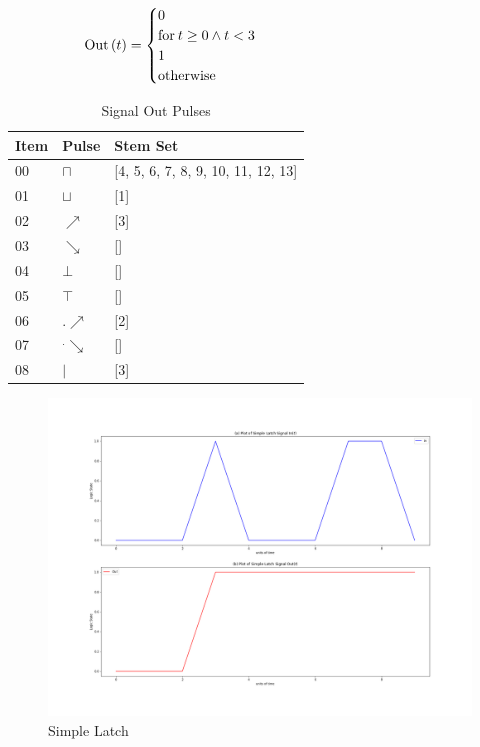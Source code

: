 \documentclass[10pt,journal]{IEEEtran}
\begin{document}
\begin{equation}
 \begin{minipage}{250pt}
\begin{flushleft} $\displaystyle \operatorname{Out}{\left(t \right)} = \begin{cases} 0 & \\  \text{for}\: t \geq 0 \wedge t < 3 \\1 & \\  \text{otherwise} \end{cases}$  \end{flushleft}
 \end{minipage}
 \end{equation}
\begin{table}[H] \caption{Signal Out Pulses}\centering\begin{tabular}{|p{.4cm}|p{.5cm}|p{6.5cm}|}\hline Item&Pulse &Stem Set\\ \hline 00& \footnotesize$\sqcap$ & \footnotesize[4, 5, 6, 7, 8, 9, 10, 11, 12, 13]\\ \hline 01& \footnotesize$\sqcup$ & \footnotesize[1]\\ \hline 02& \footnotesize$\nearrow$ & \footnotesize[3]\\ \hline 03& \footnotesize$\searrow$ & \footnotesize[]\\ \hline 04& \footnotesize$\bot$ & \footnotesize[]\\ \hline 05& \footnotesize$\top$ & \footnotesize[]\\ \hline 06& \footnotesize$.\nearrow$ & \footnotesize[2]\\ \hline 07& \footnotesize$^.\searrow$ & \footnotesize[]\\ \hline 08& \footnotesize$|$ & \footnotesize[3]\\ \hline \end{tabular} \end{table} 
\begin{figure}[H]
\centering\includegraphics[width=1\linewidth,height=0.15\textheight]{FG005.png}
\caption{Simple Latch}
\label{fig:FG005.png}
\end{figure}
\end{document}
